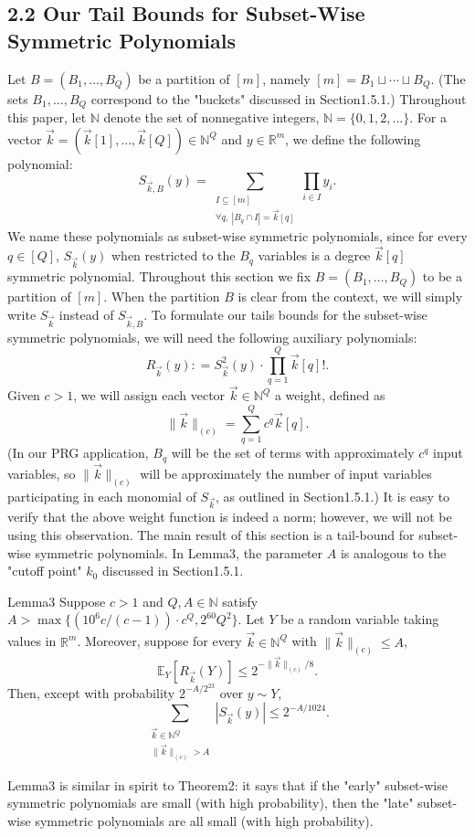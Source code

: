\subsection*{2.2 Our Tail Bounds for Subset-Wise Symmetric Polynomials}
Let $B=(B_1,\ldots,B_Q)$ be a partition of $[m]$, namely $[m]=B_1\sqcup\cdots\sqcup B_Q$. (The sets $B_1,\ldots,B_Q$ correspond to the "buckets" discussed in Section1.5.1.) Throughout this paper, let $\mathbb N$ denote the set of nonnegative integers, $\mathbb N=\{0,1,2,\ldots\}$. For a vector $\vec k=(\vec k[1],\ldots,\vec k[Q])\in\mathbb N^Q$ and $y\in\mathbb R^m$, we define the following polynomial:
\[
S_{\vec k,B}(y)=\sum_{\substack{I\subseteq[m]\\\forall q,\ |B_q\cap I|=\vec k[q]}}\prod_{i\in I}y_i.
\]
We name these polynomials as subset-wise symmetric polynomials, since for every $q\in[Q]$, $S_{\vec k}(y)$ when restricted to the $B_q$ variables is a degree $\vec k[q]$ symmetric polynomial.
Throughout this section we fix $B=(B_1,\ldots,B_Q)$ to be a partition of $[m]$. When the partition $B$ is clear from the context, we will simply write $S_{\vec k}$ instead of $S_{\vec k,B}$. To formulate our tails bounds for the subset-wise symmetric polynomials, we will need the following auxiliary polynomials:
\[
R_{\vec k}(y)\mathrel{\mathop:}=S_{\vec k}^2(y)\cdot\prod_{q=1}^Q\vec k[q]!.
\]
Given $c>1$, we will assign each vector $\vec k\in\mathbb N^Q$ a weight, defined as
\[
\|\vec k\|_{(c)}=\sum_{q=1}^Qc^q\vec k[q].
\]
(In our PRG application, $B_q$ will be the set of terms with approximately $c^q$ input variables, so $\|\vec k\|_{(c)}$ will be approximately the number of input variables participating in each monomial of $S_{\vec k}$, as outlined in Section1.5.1.) It is easy to verify that the above weight function is indeed a norm; however, we will not be using this observation.
The main result of this section is a tail-bound for subset-wise symmetric polynomials. In Lemma3, the parameter $A$ is analogous to the "cutoff point" $k_0$ discussed in Section1.5.1.
\begin{authorclaim}{Lemma3}
Suppose $c>1$ and $Q,A\in\mathbb N$ satisfy $A>\max\{(10^6c/(c-1))\cdot c^Q,2^{60}Q^2\}$. Let $Y$ be a random variable taking values in $\mathbb R^m$. Moreover, suppose for every $\vec k\in\mathbb N^Q$ with $\|\vec k\|_{(c)}\le A$,
\[
\mathbb E_Y[R_{\vec k}(Y)]\le2^{-\|\vec k\|_{(c)}/8}.
\]
Then, except with probability $2^{-A/2^{23}}$ over $y\sim Y$,
\[
\sum_{\substack{\vec k\in\mathbb N^Q\\\|\vec k\|_{(c)}>A}}|S_{\vec k}(y)|\le2^{-A/1024}.
\]
\end{authorclaim}
Lemma3 is similar in spirit to Theorem2: it says that if the "early" subset-wise symmetric polynomials are small (with high probability), then the "late" subset-wise symmetric polynomials are all small (with high probability).
